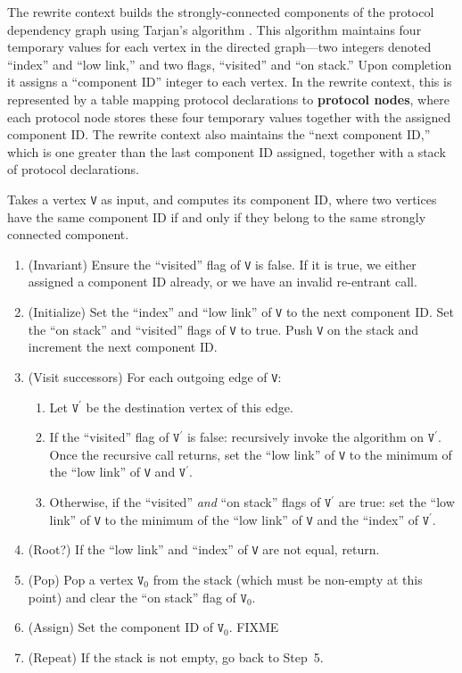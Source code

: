 \documentclass[../generics]{subfiles}
\begin{document}
The rewrite context builds the strongly-connected components of the protocol dependency graph using Tarjan's algorithm \cite{tarjan}. This algorithm maintains four temporary values for each vertex in the directed graph---two integers denoted ``index'' and ``low link,'' and two flags, ``visited'' and ``on stack.'' Upon completion it assigns a ``component ID'' integer to each vertex. In the rewrite context, this is represented by a table mapping protocol declarations to \textbf{protocol nodes}, where each protocol node stores these four temporary values together with the assigned component ID. The rewrite context also maintains the ``next component ID,'' which is one greater than the last component ID assigned, together with a stack of protocol declarations.

%
%
\begin{algorithm}
Takes a vertex \texttt{V} as input, and computes its component ID, where two vertices have the same component ID if and only if they belong to the same strongly connected component.
\begin{enumerate}
\item (Invariant) Ensure the ``visited'' flag of \texttt{V} is false. If it is true, we either assigned a component ID already, or we have an invalid re-entrant call.
\item (Initialize) Set the ``index'' and ``low link'' of \texttt{V} to the next component ID. Set the ``on stack'' and ``visited'' flags of \texttt{V} to true. Push \texttt{V} on the stack and increment the next component ID.
\item (Visit successors) For each outgoing edge of \texttt{V}:
\begin{enumerate}
\item Let $\texttt{V}^\prime$ be the destination vertex of this edge.
\item If the ``visited'' flag of $\texttt{V}^\prime$ is false: recursively invoke the algorithm on $\texttt{V}^\prime$. Once the recursive call returns, set the ``low link'' of \texttt{V} to the minimum of the ``low link'' of \texttt{V} and $\texttt{V}^\prime$.
\item Otherwise, if the ``visited'' \emph{and} ``on stack'' flags of $\texttt{V}^\prime$ are true: set the ``low link'' of \texttt{V} to the minimum of the ``low link'' of \texttt{V} and the ``index'' of $\texttt{V}^\prime$.
\end{enumerate}
\item (Root?) If the ``low link'' and ``index'' of \texttt{V} are not equal, return.
\item (Pop) Pop a vertex $\texttt{V}_0$ from the stack (which must be non-empty at this point) and clear the ``on stack'' flag of $\texttt{V}_0$.
\item (Assign) Set the component ID of $\texttt{V}_0$. FIXME
\item (Repeat) If the stack is not empty, go back to Step~5.
\end{enumerate}
\end{algorithm}
\end{document}
